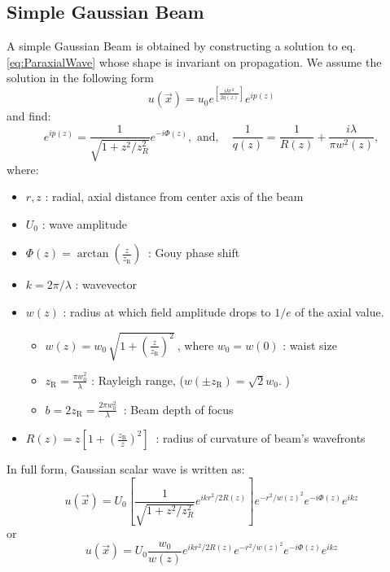 \documentclass[11pt,letterpaper]{article}
\begin{document}
\subsection{Simple Gaussian Beam}
A simple Gaussian Beam is obtained by constructing a solution to eq. \ref{eq:ParaxialWave} whose shape is invariant on propagation. We assume the solution in the following form \begin{equation}
u(\vec{x})=u_0 e^{\left[ \frac{ikr^2}{2q(z)}\right]} e^{ip(z)}
\end{equation}
and find: 
\begin{equation*}
e^{ip(z)}=\frac{1}{\sqrt{1+z^2/z_R^2}}e^{-i\Phi(z)},
\text{  and,  }\;\;\;
\frac{1}{q(z)}=\frac{1}{R(z)}+\frac{i\lambda}{\pi w^2(z)},
\end{equation*}
where:
\begin{itemize}
\item[]$r,z$ : radial, axial distance from center axis of the beam
\item[]$U_0$ : wave amplitude
\item[]$\Phi(z)= \arctan \left( \frac{z}{z_\mathrm{R}} \right) \ $ : Gouy phase shift
\item[]$k=2\pi/\lambda$ : wavevector
\item[]$w(z)$ : radius at which field amplitude drops to $1/e$ of the axial value.
\begin{itemize}
\item $w(z) = w_0 \,\sqrt{1+{\left(\frac{z}{z_\mathrm{R}}\right)}^2}\ $, where $w_0=w(0)$ : waist size
\item $z_\mathrm{R} = \frac{\pi w_0^2}{\lambda} $ : Rayleigh range, ($w(\pm z_\mathrm{R}) = \sqrt{2} w_0.$ ) 
\item $b = 2 z_\mathrm{R} = \frac{2 \pi w_0^2}{\lambda} \ $ : Beam depth of focus
\end{itemize}
\item[]$R(z) = z \left[{ 1+ {\left( \frac{z_\mathrm{R}}{z} \right)}^2 } \right] \ $ : radius of curvature of beam's wavefronts
\end{itemize}
In full form, Gaussian scalar wave is written as: 
\begin{equation}\label{eq:uG}
\boxed{
	u(\vec{x}) = U_0  \left[\frac{1}{\sqrt{1+z^2/z_R^2}} e^{ikr^2/2R(z)}\right]e^{-r^2/w(z)^2} e^{-i\Phi(z)} e^{ikz}
	}
\end{equation}
or
\begin{equation}\label{eq:uG2}
\boxed{
	u(\vec{x}) = U_0 \frac{w_0}{w(z)}e^{ikr^2/2R(z)}
     e^{-r^2/w(z)^2} e^{-i\Phi(z)}e^{ikz}
	}
\end{equation}
\end{document}
